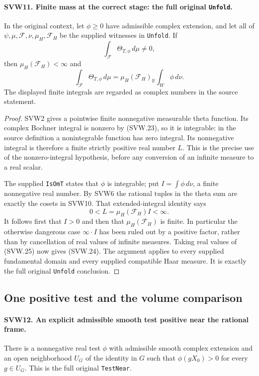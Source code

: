 \documentclass[11pt,a4paper]{article}
\numberwithin{equation}{section}
\theoremstyle{remark}\newtheorem{remark}[theorem]{Remark}
\begin{document}
\paragraph{SVW11. Finite mass at the correct stage: the full original \texttt{Unfold}.}
\label{claim:SVW11}
In the original context, let $\phi\geq0$ have admissible complex
extension, and let all of $\psi,\mu,\mathcal F,\nu,\mu_H,
\mathcal F_H$ be the supplied witnesses in \texttt{Unfold}.
If
\[
                  \int_{\mathcal F}\Theta_{T,\phi}\,d\mu\ne0,
 \tag{SVW.23}
\]
then $\mu_H(\mathcal F_H)<\infty$ and
\[
 \int_{\mathcal F}\Theta_{T,\phi}\,d\mu
          =\mu_H(\mathcal F_H)_{\mathbb R}
                                      \int_W\phi\,d\nu.
 \tag{SVW.24}
\]
The displayed finite integrals are regarded as complex numbers in
the source statement.

\begin{proof}
SVW2 gives a pointwise finite nonnegative measurable theta function.
Its complex Bochner integral is nonzero by (SVW.23), so it is
integrable: in the source definition a nonintegrable function has
zero integral.  Its nonnegative integral is therefore a finite
strictly positive real number $L$.  This is the precise use of
the nonzero-integral hypothesis, before any conversion of an
infinite measure to a real scalar.

The supplied \texttt{Is\allowbreak Om\allowbreak T} states that $\phi$ is integrable;
put $I=\int\phi\,d\nu$, a finite nonnegative real number.
By SVW6 the rational tuples in the theta sum are exactly the
cosets in SVW10.  That extended-integral identity says
\[
                       0<L=\mu_H(\mathcal F_H)I<\infty.
 \tag{SVW.25}
\]
It follows first that $I>0$ and then that
$\mu_H(\mathcal F_H)$ is finite.  In particular the otherwise
dangerous case $\infty\cdot I$ has been ruled out by a positive
factor, rather than by cancellation of real values of infinite
measures.  Taking real values of (SVW.25) now gives (SVW.24).
The argument applies to every supplied fundamental domain and
every supplied compatible Haar measure.  It is exactly the full
original \texttt{Unfold} conclusion.
\end{proof}

\subsection{One positive test and the volume comparison}

\paragraph{SVW12. An explicit admissible smooth test positive near the rational frame.}
\label{claim:SVW12}
There is a nonnegative real test $\phi$ with admissible smooth
complex extension and an open neighborhood $U_G$ of the identity
in $G$ such that $\phi(gX_0)>0$ for every $g\in U_G$.
This is the full original \texttt{Test\allowbreak Near}.
\end{document}
